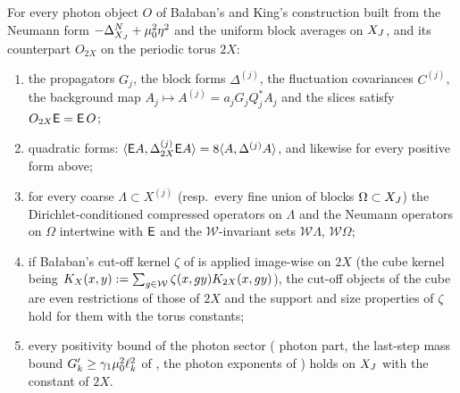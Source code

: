\begin{lemma}\label{lem:a01:PE}
For every photon object $O$ of Ba{\l}aban's and King's construction built from the Neumann form $-\Delta^N_{X_J}+\mu_0^2\eta^2$ and the uniform block averages on $X_J$, and its counterpart $O_{2X}$ on the periodic torus $2X$:
\begin{enumerate}[label=(\alph*),nosep]
\item the propagators $G_j$, the block forms $\Delta^{(j)}$, the fluctuation covariances $C^{(j)}$, the background map $A_j\mapsto A^{(j)}=a_jG_jQ_j^*A_j$ and the slices satisfy $O_{2X}\mathsf E=\mathsf E\,O$;
\item quadratic forms: $\langle \mathsf E A,\Delta^{(j)}_{2X}\mathsf E A\rangle=8\langle A,\Delta^{(j)}A\rangle$, and likewise for every positive form above;
\item for every coarse $\Lambda\subset X^{(j)}$ (resp.\ every fine union of blocks $\Omega\subset X_J$) the Dirichlet-conditioned compressed operators on $\Lambda$ and the Neumann operators on $\Omega$ intertwine with $\mathsf E$ and the $\mathcal W$-invariant sets $\mathcal W\Lambda$, $\mathcal W\Omega$;
\item if Ba{\l}aban's cut-off kernel $\zeta$ of \cite[(2.44)]{Ba2} is applied image-wise on $2X$ (the cube kernel being $K_X(x,y):=\sum_{g\in\mathcal W}\zeta(x,gy)K_{2X}(x,gy)$), the cut-off objects of the cube are even restrictions of those of $2X$ and the support and size properties of $\zeta$ hold for them with the torus constants;
\item every positivity bound of the photon sector (\cite[(3.29), Prop.~3.1]{Ba2} photon part, the last-step mass bound $G'_k\ge\gamma_1\mu_0^2\ell_k^2$ of \cite[(3.11)]{Ba2}, the photon exponents of \cite[(3.26)]{Ba2}) holds on $X_J$ with the constant of $2X$.
\end{enumerate}
\end{lemma}
